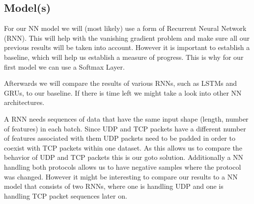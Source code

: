 \documentclass[
	ngerman,
	ruledheaders=section,%
	class=report,%
	thesis={type=bachelor},%
	accentcolor=9c,%
	custommargins=true,%
	marginpar=false,%
	parskip=half-,%
	fontsize=11pt,%
]{tudapub}
\begin{document}




\subsection{Model(s)}


For our NN model we will (most likely) use a form of Recurrent Neural Network (RNN).
This will help with the vanishing gradient problem and make sure all our previous results will be taken into account.
However it is important to establish a baseline, which will help us establish a measure of progress. %
This is why for our first model we can use a Softmax Layer.

Afterwards we will compare the results of various RNNs, such as LSTMs and GRUs, to our baseline.
If there is time left we might take a look into other NN architectures. %

A RNN needs sequences of data that have the same input shape (length, number of features) in each batch.
Since UDP and TCP packets have a different number of features associated with them UDP packets need to be padded in order to coexist with TCP packets within one dataset.
As this allows us to compare the behavior of UDP and TCP packets this is our goto solution.
Additionally a NN handling both protocols allows us to have negative samples where the protocol was changed.
However it might be interesting to compare our results to a NN model that consists of two RNNs, where one is handling UDP and one is handling TCP packet sequences later on.
\end{document}
